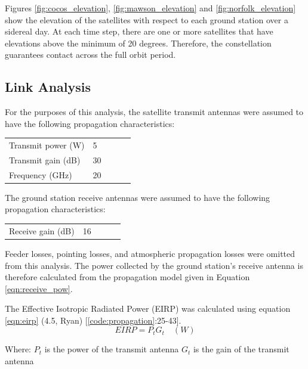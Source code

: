 \documentclass[12pt]{article}
\begin{document}
Figures \ref{fig:cocos_elevation}, \ref{fig:mawson_elevation} and \ref{fig:norfolk_elevation} show the elevation of the satellites with respect to each ground station over a sidereal day. At each time step, there are one or more satellites that have elevations above the minimum of 20 degrees. Therefore, the constellation guarantees contact across the full orbit period. 

\subsection{Link Analysis}

For the purposes of this analysis, the satellite transmit antennas were assumed to have the following propagation characteristics:

\begin{table}[H]
\begin{tabular}{lllll}
Transmit power (W)          & 5  \\ 
Transmit gain  (dB)         & 30  \\
Frequency (GHz)             & 20 \\
\end{tabular}
\label{table:transmit}
\end{table}

The ground station receive antennas were assumed to have the following propagation characteristics:
\begin{table}[H]
\begin{tabular}{lllll}
Receive gain  (dB)         & 16  \\ 
\end{tabular}
\label{table:transmit}
\end{table} 

Feeder losses, pointing losses, and atmospheric propagation losses were omitted from this analysis. The power collected by the ground station's receive antenna is therefore calculated from the propagation model given in Equation \ref{eqn:receive_pow}. 

The Effective Isotropic Radiated Power (EIRP) was calculated using equation \ref{eqn:eirp} (4.5, Ryan) [\ref{code:propagation}:25-43].
\begin{equation}
    EIRP = P_t G_t \quad(W)
    \label{eqn:eirp}
\end{equation}

Where: \newline
\quad $P_t$ is the power of the transmit antenna \newline
\quad $G_t$ is the gain of the transmit antenna \newline
\end{document}
